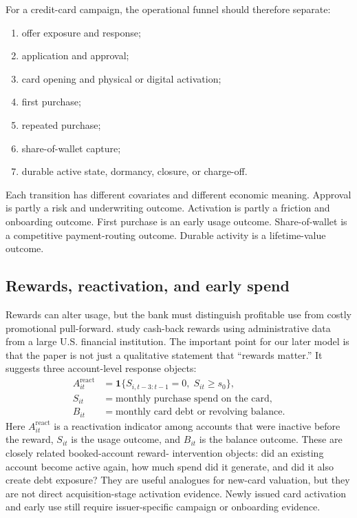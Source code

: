 \documentclass[11pt]{article}
\newcommand{\1}{\mathbf{1}}
\begin{document}
For a credit-card campaign, the operational funnel should therefore separate:
\begin{enumerate}[label=\arabic*.]
  \item offer exposure and response;
  \item application and approval;
  \item card opening and physical or digital activation;
  \item first purchase;
  \item repeated purchase;
  \item share-of-wallet capture;
  \item durable active state, dormancy, closure, or charge-off.
\end{enumerate}
Each transition has different covariates and different economic meaning.
Approval is partly a risk and underwriting outcome. Activation is partly a
friction and onboarding outcome. First purchase is an early usage outcome.
Share-of-wallet is a competitive payment-routing outcome. Durable activity is a
lifetime-value outcome.

\subsection{Rewards, reactivation, and early spend}

Rewards can alter usage, but the bank must distinguish profitable use from
costly promotional pull-forward. \citet{agarwal2010rewards} study cash-back
rewards using administrative data from a large U.S. financial institution. The
important point for our later model is that the paper is not just a qualitative
statement that ``rewards matter.'' It suggests three account-level response
objects:
\begin{align}
  A_{it}^{\mathrm{react}}
    &= \1\{S_{i,t-3:t-1}=0,\; S_{it}\geq s_0\}, \label{eq:reward-reactivation}\\
  S_{it}
    &= \text{monthly purchase spend on the card}, \label{eq:reward-spend-outcome}\\
  B_{it}
    &= \text{monthly card debt or revolving balance}. \label{eq:reward-debt-outcome}
\end{align}
Here $A_{it}^{\mathrm{react}}$ is a reactivation indicator among accounts that
were inactive before the reward, $S_{it}$ is the usage outcome, and $B_{it}$ is
the balance outcome. These are closely related booked-account reward-
intervention objects: did an existing account become active again, how much
spend did it generate, and did it also create debt exposure? They are useful
analogues for new-card valuation, but they are not direct acquisition-stage
activation evidence. Newly issued card activation and early use still require
issuer-specific campaign or onboarding evidence.
\end{document}
